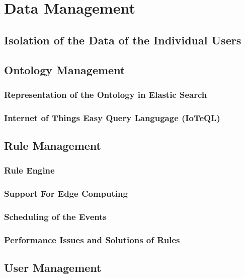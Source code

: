 \chapter{Data Management}\label{chapter:data_management}

\section{Isolation of the Data of the Individual Users}


\section{Ontology Management}

\subsection{Representation of the Ontology in Elastic Search}

\subsection{Internet of Things Easy Query Langugage (IoTeQL)}


\section{Rule Management}

\subsection{Rule Engine}

\subsection{Support For Edge Computing}

\subsection{Scheduling of the Events}

\subsection{Performance Issues and Solutions of Rules}

\section{User Management}
